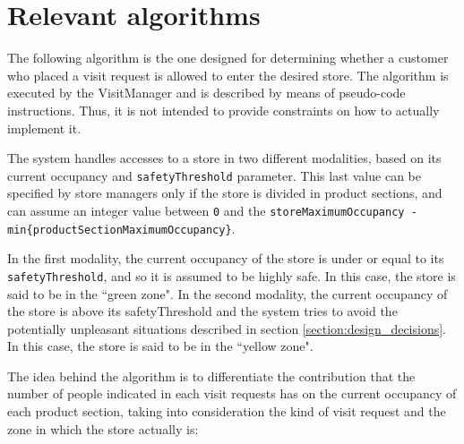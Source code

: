 \documentclass[a4paper,oneside,11pt]{book}
\begin{document}
    \section{Relevant algorithms}
    The following algorithm is the one designed for determining whether a customer who placed a visit request is allowed to enter the desired store. The algorithm is executed by the VisitManager and is described by means of pseudo-code instructions. Thus, it is not intended to provide constraints on how to actually implement it. \par
    The system handles accesses to a store in two different modalities, based on its current occupancy and \texttt{safetyThreshold} parameter. This last value can be specified by store managers only if the store is divided in product sections, and can assume an integer value between \texttt{0} and the \texttt{storeMaximumOccupancy - min\{productSectionMaximumOccupancy\}}. \par
    In the first modality, the current occupancy of the store is under or equal to its \texttt{safetyThreshold}, and so it is assumed to be highly safe. In this case, the store is said to be in the ``green zone". In the second modality, the current occupancy of the store is above its safetyThreshold and the system tries to avoid the potentially unpleasant situations described in section \ref{section:design_decisions}. In this case, the store is said to be in the ``yellow zone". \par
    The idea behind the algorithm is to differentiate the contribution that the number of people indicated in each visit requests has on the current occupancy of each product section, taking into consideration the kind of visit request and the zone in which the store actually is:
\end{document}
